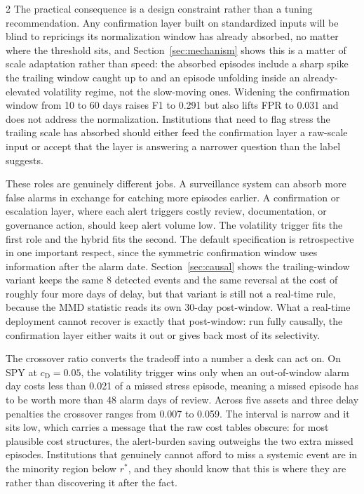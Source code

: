 \documentclass{book}
\begin{document}
\begin{multicols}{2}
The practical consequence is a design constraint rather than a tuning recommendation. Any confirmation layer built on standardized inputs will be blind to repricings its normalization window has already absorbed, no matter where the threshold sits, and Section~\ref{sec:mechanism} shows this is a matter of scale adaptation rather than speed: the absorbed episodes include a sharp spike the trailing window caught up to and an episode unfolding inside an already-elevated volatility regime, not the slow-moving ones. Widening the confirmation window from 10 to 60 days raises F1 to 0.291 but also lifts FPR to 0.031 and does not address the normalization. Institutions that need to flag stress the trailing scale has absorbed should either feed the confirmation layer a raw-scale input or accept that the layer is answering a narrower question than the label suggests.

These roles are genuinely different jobs. A surveillance system can absorb more false alarms in exchange for catching more episodes earlier. A confirmation or escalation layer, where each alert triggers costly review, documentation, or governance action, should keep alert volume low. The volatility trigger fits the first role and the hybrid fits the second. The default specification is retrospective in one important respect, since the symmetric confirmation window uses information after the alarm date. Section~\ref{sec:causal} shows the trailing-window variant keeps the same 8 detected events and the same reversal at the cost of roughly four more days of delay, but that variant is still not a real-time rule, because the MMD statistic reads its own 30-day post-window. What a real-time deployment cannot recover is exactly that post-window: run fully causally, the confirmation layer either waits it out or gives back most of its selectivity.

The crossover ratio converts the tradeoff into a number a desk can act on. On SPY at $c_{\mathrm{D}}=0.05$, the volatility trigger wins only when an out-of-window alarm day costs less than 0.021 of a missed stress episode, meaning a missed episode has to be worth more than 48 alarm days of review. Across five assets and three delay penalties the crossover ranges from 0.007 to 0.059. The interval is narrow and it sits low, which carries a message that the raw cost tables obscure: for most plausible cost structures, the alert-burden saving outweighs the two extra missed episodes. Institutions that genuinely cannot afford to miss a systemic event are in the minority region below $r^{*}$, and they should know that this is where they are rather than discovering it after the fact.


\end{multicols}
\end{document}
